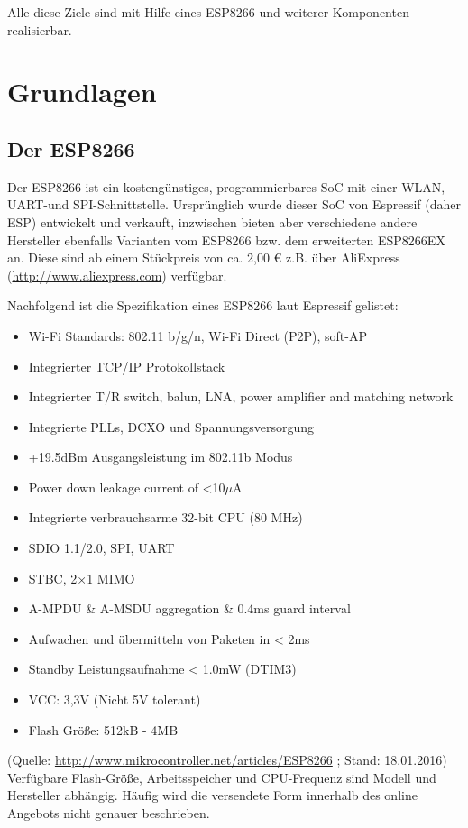 Alle diese Ziele sind mit Hilfe eines ESP8266 und weiterer Komponenten realisierbar.

\section{Grundlagen}
\subsection{Der ESP8266}
Der ESP8266 ist ein kostengünstiges, programmierbares \ac{SoC} mit einer \acs{WLAN}, \acs{UART}-und \acs{SPI}-Schnittstelle.
Ursprünglich wurde dieser \acs{SoC} von Espressif (daher ESP) entwickelt und verkauft, inzwischen bieten aber verschiedene andere Hersteller ebenfalls Varianten vom ESP8266 bzw. dem erweiterten ESP8266EX an.
Diese sind ab einem Stückpreis von ca. 2,00 € z.B. über AliExpress (\url{http://www.aliexpress.com}) verfügbar.

Nachfolgend ist die Spezifikation eines ESP8266 laut Espressif gelistet:

\begin{itemize}
    \item Wi-Fi Standards: 802.11 b/g/n, Wi-Fi Direct (\acs{P2P}), \acs{soft-AP}
    \item Integrierter TCP/IP Protokollstack
    \item Integrierter \acs{T/R} switch, \acs{balun}, \acs{LNA}, power amplifier and matching network
    \item Integrierte \acs{PLL}s, \acs{DCXO} und Spannungsversorgung
    \item +19.5dBm Ausgangsleistung im 802.11b Modus
    \item Power down leakage current of <10$\mu$A
    \item Integrierte verbrauchsarme 32-bit CPU (80 MHz)
    \item \acs{SDIO} 1.1/2.0, \acs{SPI}, \acs{UART}
    \item \acs{STBC}, 2×1 \acs{MIMO}
    \item \acs{A-MPDU} \& \acs{A-MSDU} aggregation \& 0.4ms guard interval
    \item Aufwachen und übermitteln von Paketen in < 2ms
    \item Standby Leistungsaufnahme < 1.0mW (\acs{DTIM3})
    \item\acs{VCC}: 3,3V (Nicht 5V tolerant)
    \item Flash Größe: 512kB - 4MB 
\end{itemize}
(Quelle: \url{http://www.mikrocontroller.net/articles/ESP8266} ; Stand: 18.01.2016)
Verfügbare Flash-Größe, Arbeitsspeicher und CPU-Frequenz sind Modell und Hersteller abhängig. Häufig wird die versendete Form innerhalb des online Angebots nicht genauer beschrieben.

